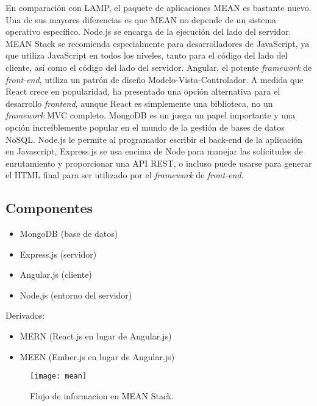 En comparación con LAMP, el paquete de aplicaciones MEAN es bastante nuevo. Una de sus mayores diferencias es que MEAN no depende de un sistema operativo específico. Node.js se encarga de la ejecución del lado del servidor. MEAN Stack se recomienda especialmente para desarrolladores de JavaScript, ya que utiliza JavaScript en todos los niveles, tanto para el código del lado del cliente, así como el código del lado del servidor. Angular, el potente \textit{framework} de \textit{front-end}, utiliza un patrón de diseño Modelo-Vista-Controlador. A medida que React crece en popularidad, ha presentado una opción alternativa para el desarrollo \textit{frontend}, aunque React es simplemente una biblioteca, no un \textit{framework} MVC completo. MongoDB es un juega un papel importante y una opción increíblemente popular en el mundo de la gestión de bases de datos NoSQL. Node.js le permite al programador escribir el back-end de la aplicación en Javascript, Express.js se usa encima de Node para manejar las solicitudes de enrutamiento y proporcionar una API REST, o incluso puede usarse para generar el HTML final para ser utilizado por el \textit{framework} de \textit{front-end}.
\subsection{Componentes}
\begin{itemize}
  \item MongoDB (base de datos)
  \item Express.js (servidor)
  \item Angular.js (cliente)
  \item Node.js (entorno del servidor)
\end{itemize}

Derivados:

\begin{itemize}
  \item MERN (React.js en lugar de Angular.js)
  \item MEEN (Ember.js en lugar de Angular.js)
\end{itemize}

\begin{figure}[H]
  \centering
  \texttt{[image: mean]}
  \caption{Flujo de informacion en MEAN Stack.}
\end{figure}

